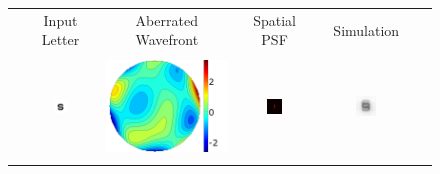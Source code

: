 
\begin{figure}[!htb]
	\centering

	\begin{tabular}{@{}r@{ } c@{ } c@{ } c@{ } c@{ } c }
	&
	\small{Input Letter} &
	\small{Aberrated Wavefront} &
	\small{Spatial PSF} &
	\small{Simulation} & \\ \\
	
	\begin{sideways} \parbox[b]{25mm} {} \end{sideways} &
	\includegraphics[width= 0.22\textwidth]{../../__Images/05/synthetic_sims/S_20-200@4x.png} &
	\includegraphics[height=0.22\textwidth]{../../__Images/05/synthetic_sims/Wavefront_highorder.png} &
	\includegraphics[width= 0.22\textwidth]{../../__Images/05/synthetic_sims/PSF_highorder.png} &
	\includegraphics[width= 0.22\textwidth]{../../__Images/05/synthetic_sims/S_20-200_f50_simulated(high-order).png}			\\ \\
	

\end{tabular}
\end{figure}

